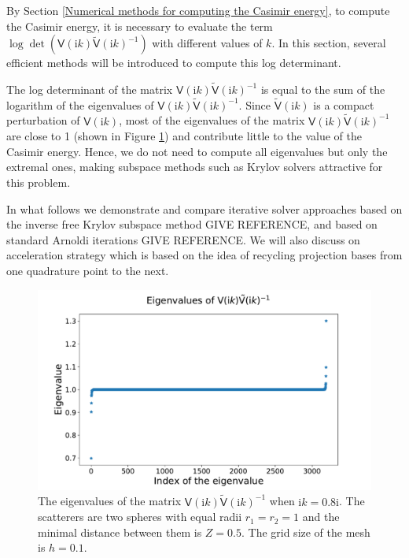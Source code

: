 By Section \ref{Numerical methods for computing the Casimir energy}, to compute the Casimir energy, it is necessary to evaluate the term
$\log\det(\mathsf{V}(\mathrm{i}k)\tilde{\mathsf{V}}(\mathrm{i}k)^{-1})$ 
with different values of $k$. In this section, several efficient methods will be introduced to compute this log determinant.

The log determinant of the matrix $\mathsf{V}(\mathrm{i}k)\tilde{\mathsf{V}}(\mathrm{i}k)^{-1}$ is equal to the sum of the logarithm of the eigenvalues of 
$\mathsf{V}(\mathrm{i}k)\tilde{\mathsf{V}}(\mathrm{i}k)^{-1}$. Since $\tilde{\mathsf{V}}(\mathrm{i}k)$ is a compact perturbation of $\mathsf{V}(\mathrm{i}k)$,
most of the eigenvalues of the matrix $\mathsf{V}(\mathrm{i}k)\tilde{\mathsf{V}}(\mathrm{i}k)^{-1}$ are close to 1 
(shown in Figure \ref{eigenvalues of VVtilde}) and contribute little to the value of the Casimir energy. Hence, we do not need to compute all eigenvalues but only
the extremal ones, making subspace methods such as Krylov solvers attractive for this problem.

In what follows we demonstrate and compare iterative solver approaches based on the inverse free Krylov subspace method \cite{golub2002inverse} \cite{money2005algorithm} {\color{red} GIVE REFERENCE}, 
and based on standard Arnoldi iterations \cite{arnoldi1951principle}{\color{red} GIVE REFERENCE}.
We will also discuss on acceleration strategy which is based on the idea of recycling projection bases from one quadrature point to the next. 


\begin{figure}[H]
    \centering
    \includegraphics[scale = 0.5]{figures/eigenvalue_of_VVtilde.pdf}
    \caption{The eigenvalues of the matrix $\mathsf{V}(\mathrm{i}k)\tilde{\mathsf{V}}(\mathrm{i}k)^{-1}$ when $\mathrm{i}k = 0.8\mathrm{i}$.
    The scatterers are two spheres with equal radii $r_{1} = r_{2} = 1$ and the minimal distance between them is $Z = 0.5$. The grid size of the mesh is $h = 0.1$.}
    \label{eigenvalues of VVtilde}
\end{figure}

